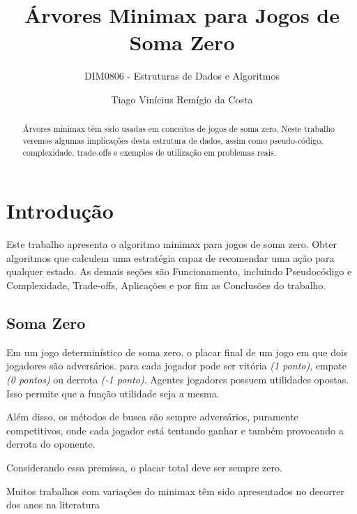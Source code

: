 \documentclass[sigplan,screen]{acmart}
\begin{document}
\title{Árvores Minimax para Jogos de Soma Zero}
\subtitle{DIM0806 - Estruturas de Dados e Algoritmos}

\author{Tiago Vinícius Remígio da Costa}

\begin{abstract}
  Árvores minimax têm sido usadas em conceitos de jogos de soma zero. 
  Neste trabalho veremos algumas implicações desta estrutura de dados, 
  assim como pseudo-código, complexidade, trade-offs e exemplos de utilização em problemas reais.
\end{abstract}


\maketitle
\pagestyle{plain}

\section{Introdução}
Este trabalho apresenta o algoritmo minimax \cite{russel2010} para jogos de soma zero. 
Obter algoritmos que calculem uma estratégia capaz de recomendar uma ação para qualquer estado.
As demais seções são Funcionamento, incluindo Pseudocódigo e Complexidade, Trade-offs, Aplicações e por fim as Conclusões do trabalho.

\subsection{Soma Zero}
Em um jogo determinístico de soma zero, o placar final de um jogo em que dois jogadores são adversários.
para cada jogador pode ser vitória {\itshape(1 ponto)}, empate {\itshape(0 pontos)} ou derrota {\itshape(-1 ponto)}. 
Agentes jogadores possuem utilidades opostas. Isso permite que a função utilidade seja a mesma.

Além disso, os métodos de busca são sempre adversários, puramente competitivos, onde cada jogador está tentando ganhar e também provocando a derrota do oponente.

Considerando essa premissa, o placar total deve ser sempre zero.

Muitos trabalhos com variações do minimax têm sido apresentados no decorrer dos anos na literatura \cite{Diderich93}
\end{document}

